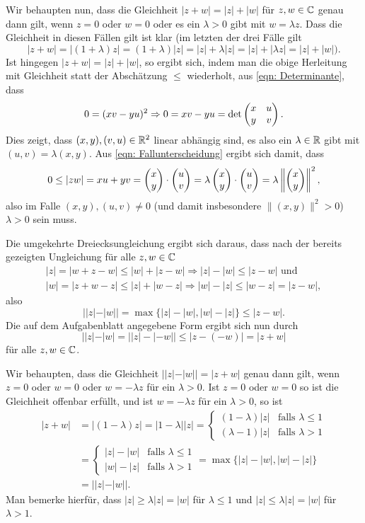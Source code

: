 \documentclass[a4paper,10pt]{article}
\begin{document}
Wir behaupten nun, dass die Gleichheit $|z+w| = |z|+|w|$ für $z, w \in \mathbb{C}$ genau dann gilt, wenn $z = 0$ oder $w = 0$ oder es ein $\lambda > 0$ gibt mit $w = \lambda z$. Dass die Gleichheit in diesen Fällen gilt ist klar (im letzten der drei Fälle gilt \[
 |z+w| = |(1+\lambda)z| = (1+\lambda)|z| = |z| + \lambda|z| = |z| + |\lambda z| = |z|+|w| ).
\]
Ist hingegen $|z+w| = |z|+|w|$, so ergibt sich, indem man die obige Herleitung mit Gleichheit statt der Abschätzung $\leq$ wiederholt, aus \eqref{eqn: Determinante}, dass
\[
 0 = (xv-yu)^2 \Rightarrow 0 = xv-yu = \det \begin{pmatrix}x&u\\y&v\end{pmatrix}.
\]
Dies zeigt, dass $(x,y), (v,u) \in \mathbb{R}^2$ linear abhängig sind, es also ein $\lambda \in \mathbb{R}$ gibt mit $(u,v) = \lambda (x,y)$. Aus \eqref{eqn: Fallunterscheidung} ergibt sich damit, dass
\[
 0
 \leq |zw| = xu+yv
 = \begin{pmatrix}x\\y\end{pmatrix} \cdot \begin{pmatrix}u\\v\end{pmatrix}
 = \lambda \begin{pmatrix}x\\y\end{pmatrix} \cdot \begin{pmatrix}u\\v\end{pmatrix}
 = \lambda \left\|\begin{pmatrix}x\\y\end{pmatrix}\right\|^2,
\]
also im Falle $(x,y), (u,v) \neq 0$ (und damit insbesondere $\|(x,y)\|^2 > 0$) $\lambda > 0$ sein muss.

Die umgekehrte Dreiecksungleichung ergibt sich daraus, dass nach der bereits gezeigten Ungleichung für alle $z, w \in \mathbb{C}$
\begin{gather*}
 |z| = |w+z-w| \leq |w| + |z-w| \Rightarrow |z|-|w| \leq |z-w| \text{ und} \\
 |w| = |z+w-z| \leq |z|+|w-z| \Rightarrow |w|-|z| \leq |w-z| = |z-w|,
\end{gather*}
also
\[
 ||z|-|w|| = \max \{ |z|-|w|, |w|-|z|\} \leq |z-w|.
\]
Die auf dem Aufgabenblatt angegebene Form ergibt sich nun durch
\[
 ||z|-|w| =||z|-|-w|| \leq |z-(-w)| = |z+w|
\]
für alle $z, w \in \mathbb{C}$.

Wir behaupten, dass die Gleichheit $||z|-|w|| = |z+w|$ genau dann gilt, wenn $z=0$ oder $w=0$ oder $w = -\lambda z$ für ein $\lambda > 0$. Ist $z = 0$ oder $w = 0$ so ist die Gleichheit offenbar erfüllt, und ist $w = -\lambda z$ für ein $\lambda > 0$, so ist
\begin{align*}
 |z+w|
 &= |(1-\lambda)z| = |1-\lambda| |z|
 =
 \begin{cases}
  (1-\lambda) |z| & \text{falls } \lambda \leq 1 \\
  (\lambda-1) |z| & \text{falls } \lambda > 1
 \end{cases} \\
 &=
 \begin{cases}
  |z|-|w| &\text{falls } \lambda \leq 1 \\
  |w|-|z| &\text{falls } \lambda > 1
 \end{cases}
 = \max\{|z|-|w|, |w|-|z|\} \\
 &= ||z|-|w||.
\end{align*}
Man bemerke hierfür, dass $|z| \geq \lambda |z| = |w|$ für $\lambda \leq 1$ und $|z| \leq \lambda |z| = |w|$ für $\lambda > 1$.
\end{document}
